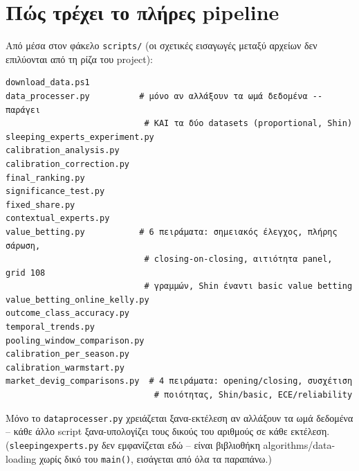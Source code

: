 \documentclass[11pt,a4paper]{article}
\newcommand{\file}[1]{\texttt{#1}}
\newcommand{\var}[1]{\texttt{#1}}
\renewcommand{\_}{\oldunderscore\allowbreak}
\begin{document}
\section{Πώς τρέχει το πλήρες pipeline}

Από μέσα στον φάκελο \file{scripts/} (οι σχετικές εισαγωγές μεταξύ αρχείων δεν επιλύονται
από τη ρίζα του project):
\begin{verbatim}
download_data.ps1
data_processer.py          # μόνο αν αλλάξουν τα ωμά δεδομένα -- παράγει
                            # ΚΑΙ τα δύο datasets (proportional, Shin)
sleeping_experts_experiment.py
calibration_analysis.py
calibration_correction.py
final_ranking.py
significance_test.py
fixed_share.py
contextual_experts.py
value_betting.py           # 6 πειράματα: σημειακός έλεγχος, πλήρης σάρωση,
                            # closing-on-closing, αιτιότητα panel, grid 108
                            # γραμμών, Shin έναντι basic value betting
value_betting_online_kelly.py
outcome_class_accuracy.py
temporal_trends.py
pooling_window_comparison.py
calibration_per_season.py
calibration_warmstart.py
market_devig_comparisons.py  # 4 πειράματα: opening/closing, συσχέτιση
                              # ποιότητας, Shin/basic, ECE/reliability
\end{verbatim}
Μόνο το \file{data\_processer.py} χρειάζεται ξανα-εκτέλεση αν αλλάξουν τα ωμά δεδομένα --
κάθε άλλο script ξανα-υπολογίζει τους δικούς του αριθμούς σε κάθε εκτέλεση.
(\file{sleeping\_experts.py} δεν εμφανίζεται εδώ -- είναι βιβλιοθήκη algorithms/data-loading
χωρίς δικό του \var{main()}, εισάγεται από όλα τα παραπάνω.)
\end{document}
